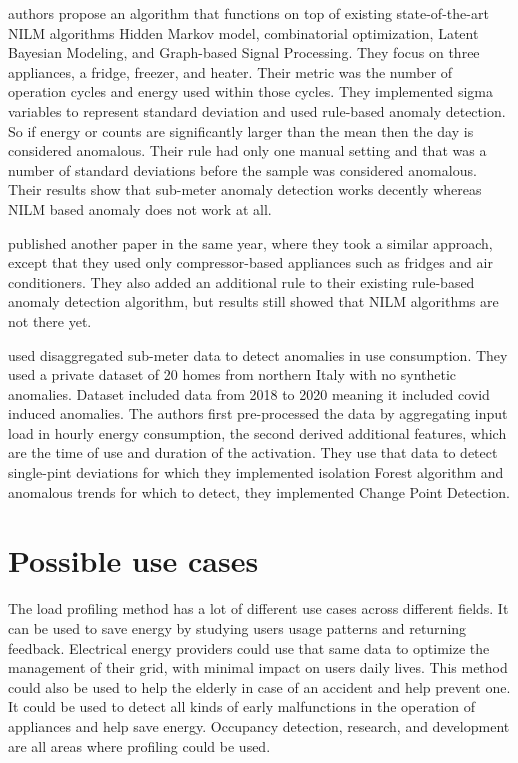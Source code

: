 \documentclass[
11pt, %
english, %
singlespacing, %
headsepline, %
]{MastersDoctoralThesis} %
\begin{document}
\cite{NILMAD2019} authors propose an algorithm
that functions on top of existing state-of-the-art NILM algorithms Hidden Markov model,
combinatorial optimization, Latent Bayesian Modeling, and Graph-based Signal Processing.
They focus on three appliances, a fridge, freezer, and heater. Their metric was the number of operation cycles and energy used within those cycles. 
They implemented sigma variables to represent standard deviation and used rule-based anomaly detection.
So if energy or counts are significantly larger than the mean then the day is considered anomalous.
Their rule had only one manual setting and that was a number of standard deviations before the sample was considered anomalous.
Their results show that sub-meter anomaly detection works decently whereas NILM based anomaly does not work at all. 

\cite{NILMAD22019} published another paper in the same year, where they took a similar approach, except that they used 
only compressor-based appliances such as fridges and air conditioners. They also added an additional rule to their existing rule-based anomaly 
detection algorithm, but results still showed that NILM algorithms are not there yet. 

\cite{Castangia2021} used disaggregated sub-meter data to detect anomalies in use consumption.
They used a private dataset of 20 homes from northern Italy with no synthetic anomalies. 
Dataset included data from 2018 to 2020 meaning it included covid induced anomalies. 
The authors first pre-processed the data by aggregating input load in hourly energy consumption, 
the second derived additional features, which are the time of use and duration of the activation.
They use that data to detect single-pint deviations for which they implemented isolation Forest algorithm and
anomalous trends for which to detect, they implemented Change Point Detection. 

\chapter{Possible use cases}

The load profiling method has a lot of different use cases across different fields.
It can be used to save energy by studying users usage patterns and returning feedback.
Electrical energy providers could use that same data to optimize the management of their grid, with minimal impact on users daily lives.
This method could also be used to help the elderly in case of an accident and help prevent one. 
It could be used to detect all kinds of early malfunctions in the operation of appliances and help save energy.
Occupancy detection, research, and development are all areas where profiling could be used. 
\end{document}
